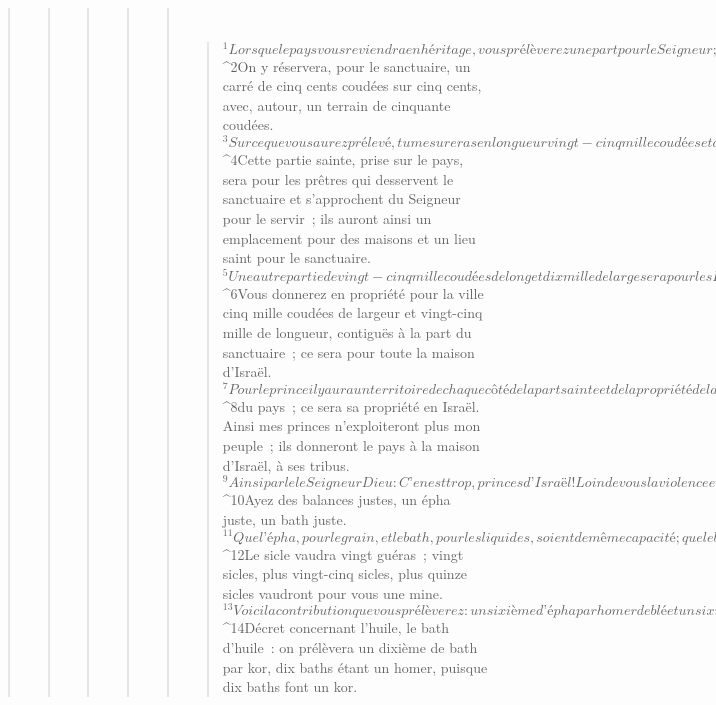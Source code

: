 \begin{verse}
\begin{verse}
\begin{verse}
\begin{verse}
\begin{verse}
         
      \bchapter{}
      \begin{verse}
${}^{1}Lorsque le pays vous reviendra en héritage, vous prélèverez une part pour le Seigneur ; elle sera sainte, prise sur le pays ; sa longueur sera de vingt-cinq mille coudées, sa largeur de vingt mille. Ce sera un territoire entièrement saint, de toute part. 
${}^{2}On y réservera, pour le sanctuaire, un carré de cinq cents coudées sur cinq cents, avec, autour, un terrain de cinquante coudées. 
${}^{3}Sur ce que vous aurez prélevé, tu mesureras en longueur vingt-cinq mille coudées et dix mille en largeur ; là sera donc le sanctuaire, le Saint des Saints. 
${}^{4}Cette partie sainte, prise sur le pays, sera pour les prêtres qui desservent le sanctuaire et s’approchent du Seigneur pour le servir ; ils auront ainsi un emplacement pour des maisons et un lieu saint pour le sanctuaire.
${}^{5}Une autre partie de vingt-cinq mille coudées de long et dix mille de large sera pour les Lévites qui desservent la Maison ; ils y posséderont des lieux d’habitation.
${}^{6}Vous donnerez en propriété pour la ville cinq mille coudées de largeur et vingt-cinq mille de longueur, contiguës à la part du sanctuaire ; ce sera pour toute la maison d’Israël.
${}^{7}Pour le prince il y aura un territoire de chaque côté de la part sainte et de la propriété de la ville, longeant la part sainte et la propriété de la ville, du côté occidental vers l’ouest, et du côté oriental vers l’est ; sa longueur correspondra à chacun des lots, depuis la frontière occidentale jusqu’à la frontière orientale 
${}^{8}du pays ; ce sera sa propriété en Israël. Ainsi mes princes n’exploiteront plus mon peuple ; ils donneront le pays à la maison d’Israël, à ses tribus.
${}^{9}Ainsi parle le Seigneur Dieu : C’en est trop, princes d’Israël ! Loin de vous la violence et la dévastation ; pratiquez le droit et la justice ; cessez vos exactions contre mon peuple – oracle du Seigneur Dieu ! 
${}^{10}Ayez des balances justes, un épha juste, un bath juste. 
${}^{11}Que l’épha, pour le grain, et le bath, pour les liquides, soient de même capacité ; que le bath contienne un dixième de homer et l’épha un dixième de homer ; c’est en homer que sera jaugée leur capacité. 
${}^{12}Le sicle vaudra vingt guéras ; vingt sicles, plus vingt-cinq sicles, plus quinze sicles vaudront pour vous une mine.
${}^{13}Voici la contribution que vous prélèverez : un sixième d’épha par homer de blé et un sixième d’épha par homer d’orge. 
${}^{14}Décret concernant l’huile, le bath d’huile : on prélèvera un dixième de bath par kor, dix baths étant un homer, puisque dix baths font un kor. 

\end{verse}
\end{verse}
\end{verse}
\end{verse}
\end{verse}
\end{verse}
